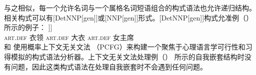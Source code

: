 与之相似，每一个允许名词与一个属格名词短语组合的构式语法也允许递归结构。相关构式可以有[DetNNP[gen]]或[NNP[gen]]形式。[DetNNP[gen]]构式允准例（）所示的例子：
\ea
\gll [\sub{NP} des Kragens [\sub{NP} des Mantels [\sub{NP} der Vorsitzenden]]]\\
	{} \textsc{art}.\textsc{def} 衣领 {} \textsc{art}.\textsc{def} 大衣 {} \textsc{art}.\textsc{def} 女主席\\
\z
 \citet{Jurafsky96a}和 \citet*{BLT2009a}使用概率上下文无关文法 （PCFG）来构建一个聚焦于心理语言学可行性和习得模拟的构式语法分析器。上下文无关文法处理例（） 所示的自我嵌套结构时没有问题，因此这类构式语法在处理自我嵌套时不会遇到任何问题。

